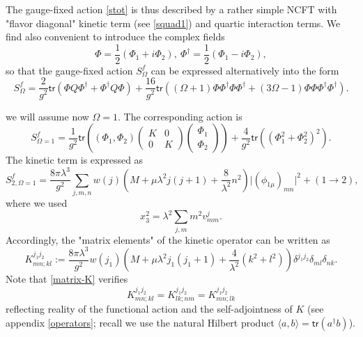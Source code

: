 \documentclass[11pt]{book}
\newcommand{\tr}{\mathsf{tr}}
\theoremstyle{break}
\begin{document}
%
The gauge-fixed action \eqref{stot} is thus described by a rather simple NCFT with "flavor diagonal" kinetic term (see \eqref{squad1}) and quartic interaction terms. We find also convenient to introduce the complex fields%
%
\begin{equation}
\Phi=\frac{1}{2}(\Phi_1+i\Phi_2),\ \Phi^\dag=\frac{1}{2}(\Phi_1-i\Phi_2),
\end{equation}
%
so that the gauge-fixed action $S^f_\Omega$ can be expressed alternatively into the form%
%
\begin{equation}
S^f_\Omega = \frac{2}{g^2} \tr\left( \Phi Q \Phi^\dag + \Phi^\dag Q\Phi \right) + \frac{16}{g^2} \tr\left( (\Omega+1) \Phi\Phi^\dag\Phi\Phi^\dag + (3\Omega-1) \Phi\Phi\Phi^\dag\Phi^\dag \right) .
\label{quasilsz}
\end{equation}


we will assume now $\Omega=1$. The corresponding action is%
%
\begin{equation}
S^f_{\Omega=1} = \frac{1}{g^2} \tr( (\Phi_1,\Phi_2)
\begin{pmatrix}
K&0\\
0&K
\end{pmatrix} 
\begin{pmatrix}
\Phi_1\\
\Phi_2
\end{pmatrix} 
)
+ \frac{4}{g^2} \tr( (\Phi_1^2 + \Phi_2^2)^2).\label{critical-action}
\end{equation}
%
The kinetic term is expressed as 
\begin{equation}
S^f_{2, \Omega=1}=\frac{8\pi\lambda^3}{g^2}\sum_{j,m,n}w(j)(M+\mu\lambda^2j(j+1)+\frac{8}{\lambda^2}n^2)\vert(\phi_{1\mu})_{mn}\vert^2+(1\to2)\label{kin-omega1},
\end{equation}
where we used
\begin{equation}
x_3^2 = \lambda^2 \sum_{j,m} m^2 v^j_{mm}.
\end{equation}
Accordingly, the "matrix elements" of the kinetic operator can be written as
\begin{equation}
K^{j_1 j_2}_{mn;kl} := \frac{8\pi\lambda^3}{g^2} w(j_1) ( M + \mu \lambda^2 j_1 (j_1+1) + \frac{4}{\lambda^2} (k^2+l^2) ) \delta^{j_1j_2} \delta_{ml} \delta_{nk}. \label{matrix-K} 
\end{equation}
Note that \eqref{matrix-K} verifies%
%
\begin{equation}
K^{j_1j_2}_{mn;kl} = K^{j_1j_2}_{lk;nm} = K^{j_1j_2}_{mn;lk} \label{sym-K}
\end{equation}
%
reflecting reality of the functional action and the self-adjointness of $K$ (see appendix \ref{operators}; recall we use the natural Hilbert product $\langle a,b \rangle = \tr(a^\dag b)$).\par
\end{document}
